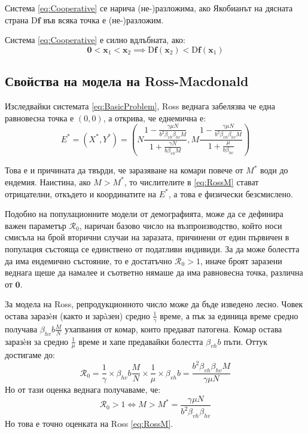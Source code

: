 \begin{definition}
  Система \eqref{eq:Cooperative} се нарича (не-)разложима, ако Якобианът на дясната страна $\mathrm{D}\mathbf{f}$ във всяка точка е (не-)разложим.
\end{definition}

\begin{definition}
  Система \eqref{eq:Cooperative} е силно вдлъбната, ако:
  \begin{equation*}
    \mathbf{0} < \mathbf{x}_1 < \mathbf{x}_2 \implies \mathrm{D}\mathbf{f}(\mathbf{x}_2) < \mathrm{D}\mathbf{f}(\mathbf{x}_1)
  \end{equation*}
\end{definition}

\subsection{Свойства на модела на Ross-Macdonald}
Изследвайки системата \eqref{eq:BasicProblem}, Ross веднага забелязва че една равновесна точка е $(0,0)$, а открива, че еднемична е:
\begin{equation}
  E^* = (X^*, Y^*) = \left(N \frac{1 - \frac{\gamma \mu N}{b^2 \beta_{vh} \beta_{hv} M}}{1 + \frac{\gamma N}{b \beta_{vh} M}}, M \frac{1 - \frac{\gamma \mu N}{b^2 \beta_{vh} \beta_{hv} M}}{1 + \frac{\mu}{b \beta_{hv}}}\right)
\end{equation}

Това е и причината да твърди, че заразяване на комари повече от $M^*$ води до ендемия. Наистина, ако $M > M^*$, то числителите в \eqref{eq:RossM} стават отрицателни, откъдето и координатите на $E^*$, а това е физически безсмислено.

Подобно на популационните модели от демографията, може да се дефинира важен параметър $\mathscr{R}_0$, наричан базово число на възпроизводство, който носи смисъла на брой вторични случаи на заразата, причинени от един първичен в популация състояща се единствено от податливи индивиди.
За да може болестта да има ендемично състояние, то е достатъчно $\mathscr{R}_0 > 1$, иначе броят заразени веднага щеше да намалее и съответно нямаше да има равновесна точка, различна от $\mathbf{0}$.

За модела на Ross, репродукционното число може да бъде изведено лесно.
Човек остава заразèн (както и зарàзен) средно $\frac{1}{\gamma}$ време, а пък за единица време средно получава $\beta_{hv} b \frac{M}{N}$ ухапвания от комар, които предават патогена.
Комар остава заразèн за средно $\frac{1}{\mu}$ време и хапе предавайки болестта $\beta_{vh} b$ пъти.
Оттук достигаме до:
\begin{equation}
  \mathscr{R}_0 = \frac{1}{\gamma} \times \beta_{hv} b \frac{M}{N} \times \frac{1}{\mu} \times \beta_{vh} b = \frac{b^2 \beta_{vh} \beta_{hv} M}{\gamma \mu N}
\end{equation}
Но от тази оценка веднага получаваме, че:
\begin{equation}
  \mathscr{R}_0 > 1 \iff M > M^* = \frac{\gamma \mu N}{b^2 \beta_{vh} \beta_{hv}}
\end{equation}
Но това е точно оценката на Ross \eqref{eq:RossM}.

